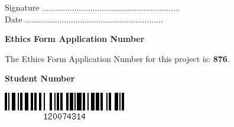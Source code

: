 \vspace{3em}
Signature ............................................................  \\

\vspace{1em}
Date ............................................................ \\

\begin{center}
    {\LARGE\bf Ethics Form Application Number}
    
The Ethics Form Application Number for this project is: \textbf{876}. 
\end{center}

\vspace{3em}
\begin{center}
    {\LARGE\bf Student Number}

\includegraphics[scale=0.8]{Images/che16-barcode}
\end{center}
